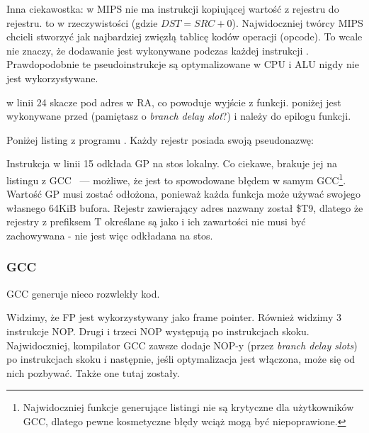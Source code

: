 Inna ciekawostka: w MIPS nie ma instrukcji kopiującej wartość z rejestru do rejestru.
 to w rzeczywistości  (gdzie $DST=SRC+0$).
Najwidoczniej twórcy MIPS chcieli stworzyć jak najbardziej zwięzłą tablicę kodów operacji (opcode).
To wcale nie znaczy, że dodawanie jest wykonywane podczas każdej instrukcji .
Prawdopodobnie te pseudoinstrukcje są optymalizowane w \ac{CPU} i \ac{ALU} nigdy nie jest wykorzystywane.

 w linii 24 skacze pod adres w \ac{RA}, co powoduje wyjście z funkcji.
 poniżej  jest wykonywane przed  (pamiętasz o \emph{branch delay slot}?) i należy do epilogu funkcji.

Poniżej listing z programu \IDA. Każdy rejestr posiada swoją pseudonazwę:



Instrukcja w linii 15 odkłada GP na stos lokalny. Co ciekawe, brakuje jej na listingu z GCC ~--- możliwe, że jest to spowodowane błędem w samym GCC\footnote{Najwidoczniej funkcje generujące listingi nie są krytyczne
dla użytkowników GCC, dlatego pewne kosmetyczne błędy wciąż mogą być niepoprawione.}.
Wartość GP musi zostać odłożona, ponieważ każda funkcja może używać swojego własnego 64KiB bufora.
Rejestr zawierający adres \puts nazwany został \$T9, dlatego że rejestry z prefiksem T określane są jako  i ich zawartości nie musi być zachowywana - nie jest więc odkładana na stos.

\subsubsection{\NonOptimizing GCC}

\NonOptimizing GCC generuje nieco rozwlekły kod.



Widzimy, że FP jest wykorzystywany jako frame pointer.
Również widzimy 3 instrukcje \ac{NOP}.
Drugi i trzeci \ac{NOP} występują po instrukcjach skoku.
Najwidoczniej, kompilator GCC zawsze dodaje \ac{NOP}-y (przez \emph{branch delay slots})
po instrukcjach skoku i następnie, jeśli optymalizacja jest włączona, może się od nich pozbywać.
Także one tutaj zostały.

